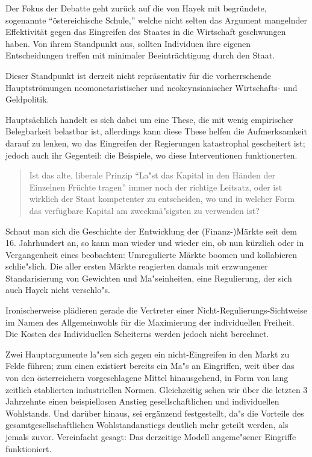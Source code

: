 \documentclass[
        onecolumn,
        a4paper,
        abstracton,
        parskip=half
        ,final
        ]{scrartcl}
\begin{document}
Der Fokus der Debatte geht zur{\"u}ck auf die von Hayek mit begr{\"u}ndete, sogenannte "`{\"o}stereichische Schule,"' welche nicht selten das Argument mangelnder Effektivit{\"a}t gegen das Eingreifen des Staates in die Wirtschaft geschwungen haben. Von ihrem Standpunkt aus, sollten Individuen ihre eigenen Entscheidungen treffen mit minimaler Beeintr{\"a}chtigung durch den Staat.

Dieser Standpunkt ist derzeit nicht repr{\"a}sentativ f{\"u}r die vorherrschende Hauptstr{\"o}mungen neomonetaristischer und neokeynsianischer Wirtschafts- und Geldpolitik.

Haupts{\"a}chlich handelt es sich dabei um eine These, die mit wenig empirischer Belegbarkeit belastbar ist, allerdings kann diese These helfen die Aufmerksamkeit darauf zu lenken, wo das Eingreifen der Regierungen katastrophal gescheitert ist; jedoch auch ihr Gegenteil: die Beispiele, wo diese Interventionen funktionerten.

\begin{quote}
Ist das alte, liberale Prinzip "`La{"s}t das Kapital in den H{\"a}nden der Einzelnen Fr{\"u}chte tragen"' immer noch der richtige Leitsatz,
 oder ist wirklich der Staat kompetenter zu entscheiden, wo und in welcher Form das verf{\"u}gbare Kapital am zweckm{\"a}{"s}igsten zu verwenden ist? \citep[S.23f]{Hayek1969}
\end{quote}

Schaut man sich die Geschichte der Entwicklung der (Finanz-)M{\"a}rkte seit dem 16. Jahrhundert an, so kann man wieder und wieder ein, ob nun k{\"u}rzlich oder in Vergangenheit eines beobachten: Umregulierte M{\"a}rkte boomen und kollabieren schlie{"s}lich. Die aller ersten M{\"a}rkte reagierten damals mit erzwungener Standarisierung von Gewichten und Ma{"s}einheiten, eine Regulierung, der sich auch Hayek nicht verschlo{"s}.

Ironischerweise pl{\"a}dieren gerade die Vertreter einer Nicht-Regulierungs-Sichtweise im Namen des Allgemeinwohls f{\"u}r die Maximierung der individuellen Freiheit. Die Kosten des Individuellen Scheiterns werden jedoch nicht berechnet.

Zwei Hauptargumente la{"s}en sich gegen ein nicht-Eingreifen in den Markt zu Felde f{\"u}hren; zum einen existiert bereits ein Ma{"s} an Eingriffen, weit {\"u}ber das von den {\"o}sterreichern vorgeschlagene Mittel hinausgehend, in Form von lang zeitlich etablierten industriellen Normen. Gleichzeitig sehen wir {\"u}ber die letzten 3 Jahrzehnte einen beispiellosen Anstieg gesellschaftlichen und individuellen Wohlstands. Und dar{\"u}ber hinaus, sei erg{\"a}nzend festgestellt, da{"s} die Vorteile des gesamtgesellschaftlichen Wohlstandanstiegs deutlich mehr geteilt werden, als jemals zuvor. Vereinfacht gesagt: Das derzeitige Modell angeme{"s}ener Eingriffe funktioniert.
\end{document}
